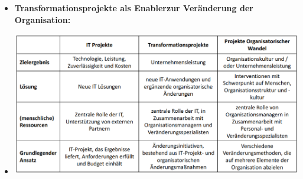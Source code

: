 \documentclass[12pt,a4paper]{article}
\begin{document}
\begin{itemize}
   \item \textbf{Transformationsprojekte als Enablerzur Veränderung der Organisation:}
   \item[] \includegraphics[scale=0.3]{ziele.png}
\end{itemize}


\newpage
\end{document}
